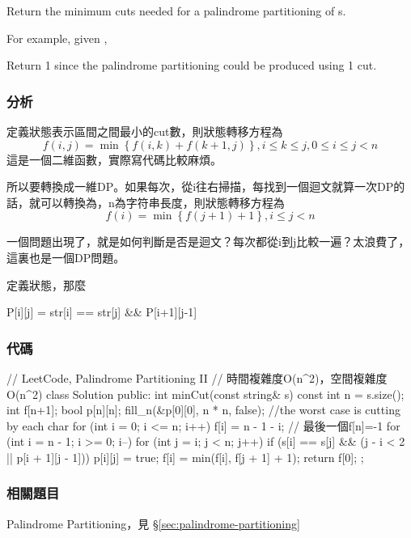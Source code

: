 Return the minimum cuts needed for a palindrome partitioning of s.

For example, given ,

Return 1 since the palindrome partitioning \code{["aa","b"]} could be produced using 1 cut.


\subsubsection{分析}
定義狀態表示區間\fn{[i,j]}之間最小的cut數，則狀態轉移方程為 
$$
f(i,j)=\min\left\{f(i,k)+f(k+1,j)\right\}, i \leq k \leq j, 0 \leq i \leq j<n
$$
這是一個二維函數，實際寫代碼比較麻煩。
 
所以要轉換成一維DP。如果每次，從i往右掃描，每找到一個迴文就算一次DP的話，就可以轉換為，n為字符串長度，則狀態轉移方程為
$$
f(i)=\min\left\{f(j+1)+1\right\}, i \leq j<n
$$

一個問題出現了，就是如何判斷\fn{[i,j]}是否是迴文？每次都從i到j比較一遍？太浪費了，這裏也是一個DP問題。

定義狀態，那麼
\begin{Code}
P[i][j] = str[i] == str[j] && P[i+1][j-1]
\end{Code}


\subsubsection{代碼}
\begin{Code}
// LeetCode, Palindrome Partitioning II
// 時間複雜度O(n^2)，空間複雜度O(n^2)
class Solution {
public:
    int minCut(const string& s) {
        const int n = s.size();
        int f[n+1];
        bool p[n][n];
        fill_n(&p[0][0], n * n, false);
        //the worst case is cutting by each char
        for (int i = 0; i <= n; i++)
            f[i] = n - 1 - i; // 最後一個f[n]=-1
        for (int i = n - 1; i >= 0; i--) {
            for (int j = i; j < n; j++) {
                if (s[i] == s[j] && (j - i < 2 || p[i + 1][j - 1])) {
                    p[i][j] = true;
                    f[i] = min(f[i], f[j + 1] + 1);
                }
            }
        }
        return f[0];
    }
};
\end{Code}


\subsubsection{相關題目}
\begindot
\item Palindrome Partitioning，見 \S \ref{sec:palindrome-partitioning}
\myenddot


